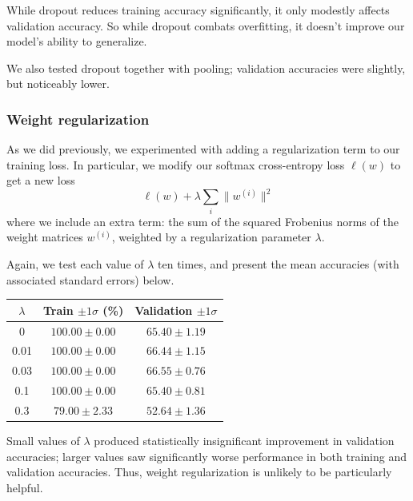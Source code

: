 \documentclass{article}
\newcommand{\sind}[1]{^{(#1)}}
\begin{document}
\begin{multicols}{2}
While dropout reduces training accuracy significantly,
it only modestly affects validation accuracy.
So while dropout combats overfitting,
it doesn't improve our model's ability to generalize.

We also tested dropout together with pooling;
validation accuracies were slightly, but noticeably lower.


\subsubsection{Weight regularization}

As we did previously,  %
we experimented with adding a regularization term
to our training loss.
In particular, we modify our softmax cross-entropy loss $\ell(w)$
to get a new loss
\begin{equation}
    \ell(w) + \lambda\sum_i \lVert w\sind{i} \rVert^2
\end{equation}
where we include an extra term:
the sum of the squared Frobenius norms of the weight matrices $w\sind{i}$,
weighted by a regularization parameter $\lambda$.

Again, we test each value of $\lambda$ ten times,
and present the mean accuracies (with associated standard errors) below.

\begin{center}
    \begin{tabular}{c|cc}
        $\lambda$ & Train $\pm 1 \sigma$ (\%) & Validation $\pm 1 \sigma$\\\hline
        0    & $100.00 \pm 0.00$ & $65.40 \pm 1.19$ \\
        0.01 & $100.00 \pm 0.00$ & $66.44 \pm 1.15$ \\
        0.03 & $100.00 \pm 0.00$ & $66.55 \pm 0.76$ \\
        0.1  & $100.00 \pm 0.00$ & $65.40 \pm 0.81$ \\
        0.3  &  $79.00 \pm 2.33$ & $52.64 \pm 1.36$ \\
    \end{tabular}
\end{center}
Small values of $\lambda$ produced
statistically insignificant improvement in validation accuracies;
larger values saw significantly worse performance
in both training and validation accuracies.
Thus, weight regularization
is unlikely to be particularly helpful.



\end{multicols}
\end{document}
